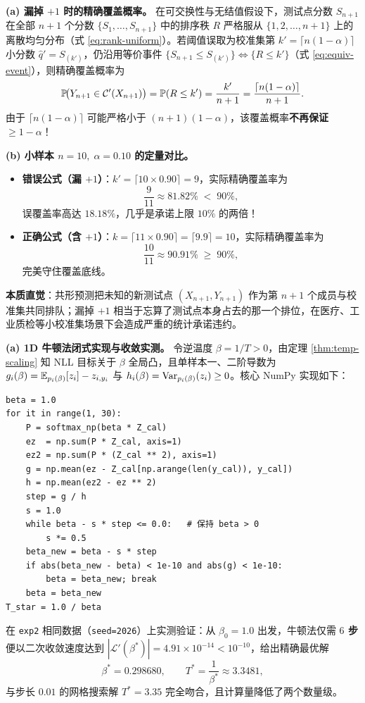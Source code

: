 
\textbf{(a) 漏掉 $+1$ 时的精确覆盖概率。}
在可交换性与无结值假设下，测试点分数 $S_{n+1}$ 在全部 $n + 1$ 个分数 $\{S_1,\dots,S_{n+1}\}$ 中的排序秩 $R$ 严格服从 $\{1, 2, \dots, n+1\}$ 上的离散均匀分布（式 \eqref{eq:rank-uniform}）。若阈值误取为校准集第 $k' = \lceil n(1-\alpha) \rceil$ 小分数 $\hat{q}' = S_{(k')}$，仍沿用等价事件 $\{S_{n+1} \le S_{(k')}\} \iff \{R \le k'\}$（式 \eqref{eq:equiv-event}），则精确覆盖概率为
\[
  \mathbb{P}\!\big(Y_{n+1} \in \mathcal{C}'(X_{n+1})\big)
  = \mathbb{P}(R \le k')
  = \frac{k'}{n + 1}
  = \frac{\lceil n(1 - \alpha) \rceil}{n + 1}.
\]
由于 $\lceil n(1-\alpha) \rceil$ 可能严格小于 $(n+1)(1-\alpha)$，该覆盖概率\textbf{不再保证 $\ge 1 - \alpha$}！

\textbf{(b) 小样本 $n = 10,\; \alpha = 0.10$ 的定量对比。}
\begin{itemize}
  \item \textbf{错误公式（漏 $+1$）}：$k' = \lceil 10 \times 0.90 \rceil = 9$，实际精确覆盖率为
  \[
    \frac{9}{11} \approx \mathbf{81.82\%} \;<\; 90\%,
  \]
  误覆盖率高达 $18.18\%$，几乎是承诺上限 $10\%$ 的两倍！
  \item \textbf{正确公式（含 $+1$）}：$k = \lceil 11 \times 0.90 \rceil = \lceil 9.9 \rceil = 10$，实际精确覆盖率为
  \[
    \frac{10}{11} \approx \mathbf{90.91\%} \;\ge\; 90\%,
  \]
  完美守住覆盖底线。
\end{itemize}
\textbf{本质直觉}：共形预测把未知的新测试点 $(X_{n+1}, Y_{n+1})$ 作为第 $n+1$ 个成员与校准集共同排队；漏掉 $+1$ 相当于忘算了测试点本身占去的那一个排位，在医疗、工业质检等小校准集场景下会造成严重的统计承诺违约。


\textbf{(a) 1D 牛顿法闭式实现与收敛实测。}
令逆温度 $\beta = 1/T > 0$，由定理 \ref{thm:temp-scaling} 知 NLL 目标关于 $\beta$ 全局凸，且单样本一、二阶导数为 $g_i(\beta) = \mathbb{E}_{p_i(\beta)}[z_i] - z_{i, y_i}$ 与 $h_i(\beta) = \operatorname{Var}_{p_i(\beta)}(z_i) \ge 0$。核心 NumPy 实现如下：
\begin{lstlisting}
beta = 1.0
for it in range(1, 30):
    P = softmax_np(beta * Z_cal)
    ez  = np.sum(P * Z_cal, axis=1)
    ez2 = np.sum(P * (Z_cal ** 2), axis=1)
    g = np.mean(ez - Z_cal[np.arange(len(y_cal)), y_cal])
    h = np.mean(ez2 - ez ** 2)
    step = g / h
    s = 1.0
    while beta - s * step <= 0.0:   # 保持 beta > 0
        s *= 0.5
    beta_new = beta - s * step
    if abs(beta_new - beta) < 1e-10 and abs(g) < 1e-10:
        beta = beta_new; break
    beta = beta_new
T_star = 1.0 / beta
\end{lstlisting}
在 \texttt{exp2} 相同数据（\texttt{seed=2026}）上实测验证：从 $\beta_0 = 1.0$ 出发，牛顿法仅需 \textbf{$6$ 步} 便以二次收敛速度达到 $|\mathcal{L}'(\beta^*)| = 4.91 \times 10^{-14} < 10^{-10}$，给出精确最优解
\[
  \beta^* = 0.298680, \qquad T^* = \frac{1}{\beta^*} \approx \mathbf{3.3481},
\]
与步长 $0.01$ 的网格搜索解 $T^* = 3.35$ 完全吻合，且计算量降低了两个数量级。

